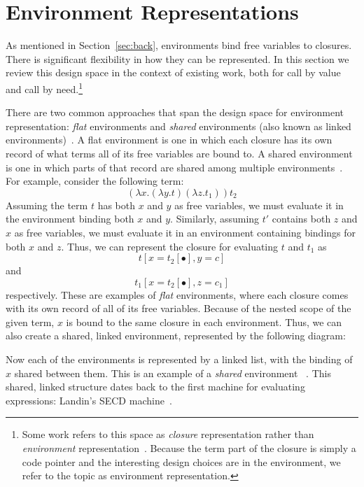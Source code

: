 \section{Environment Representations} \label{sec:env}

As mentioned in Section~\ref{sec:back}, environments bind free variables to
closures. There is significant flexibility in how they can be represented. In
this section we review this design space in the context of existing work, both
for call by value and call by need.\footnote{Some work refers to this
space as \emph{closure} representation rather than \emph{environment}
representation~\cite{shao1994space,appel1988optimizing}.  Because the term
part of the closure is simply a code pointer and the
interesting design choices are in the environment, we refer to
the topic as environment representation.}

There are two common approaches that span the design space for environment
representation: \emph{flat} environments and \emph{shared} environments (also
known as linked environments)~\cite{appel1988optimizing, shao1994space}. A flat
environment is one in which each closure has its own record of what terms all of
its free variables are bound to. A shared environment is one in which parts of
that record are shared among multiple environments~\cite{appel1988optimizing,
shao1994space}. For example, consider the following term: $$(\lambda x.(\lambda
y.t) (\lambda z.t_1)) t_2$$ Assuming the term $t$ has both $x$ and $y$ as free
variables, we must evaluate it in the environment binding both $x$ and $y$.
Similarly, assuming $t'$ contains both $z$ and $x$ as free variables, we must
evaluate it in an environment containing bindings for both $x$ and $z$. Thus, we
can represent the closure for evaluating $t$ and $t_1$  as $$t[x=t_2[\bullet],
y=c]$$ and $$t_1[x=t_2[\bullet], z=c_1]$$ respectively.  These are examples of
\emph{flat} environments, where each closure comes with its own record of all of
its free variables. Because of the nested scope of the given term, $x$ is bound
to the same closure in each environment.  Thus, we can also create a shared,
linked environment, represented by the following diagram:

\begin{center}
\end{center}
Now each of the environments is represented by a linked list, with the binding
of $x$ shared between them. This is an example of a \emph{shared} environment
~\cite{appel1988optimizing}. This shared, linked structure dates back to the 
first machine for evaluating expressions: Landin's SECD
machine~\cite{landin1964mechanical}.

